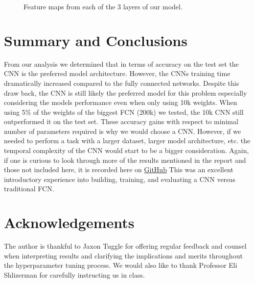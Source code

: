 \documentclass[11pt]{amsart}
\begin{document}
\begin{figure}[h]
\begin{subfigure}{0.49\textwidth}
	\end{subfigure}
\caption{Feature maps from each of the 3 layers of our model.}
\label{fig:feat_maps}
\end{figure}


\section{Summary and Conclusions}\label{sec:conclusions} 
From our analysis we determined that in terms of accuracy on the test set the CNN is the preferred model architecture. However, the CNNs training time dramatically increased compared to the fully connected networks.
Despite this draw back, the CNN is still likely the preferred model for this problem especially considering the models performance even when only using 10k weights.
When using 5\% of the weights of the biggest FCN (200k) we tested, the 10k CNN still outperformed it on the test set.
These accuracy gains with respect to minimal number of parameters required is why we would choose a CNN.
However, if we needed to perform a task with a larger dataset, larger model architecture, etc. the temporal complexity of the CNN would start to be a bigger consideration.
Again, if one is curious to look through more of the results mentioned in the report and those not included here, it is recorded here on \href{https://github.com/hunter-lybbert/uw-central/blob/main/data_analysis/hw_05/experiments/experiments.json}{GitHub}
This was an excellent introductory experience into building, training, and evaluating a CNN versus traditional FCN.

\section*{Acknowledgements}
The author is thankful to Jaxon Tuggle for offering regular feedback and counsel when interpreting results and clarifying the implications and merits throughout the hyperparameter tuning process.
We would also like to thank Professor Eli Shlizerman for carefully instructing us in class.


\end{document}
